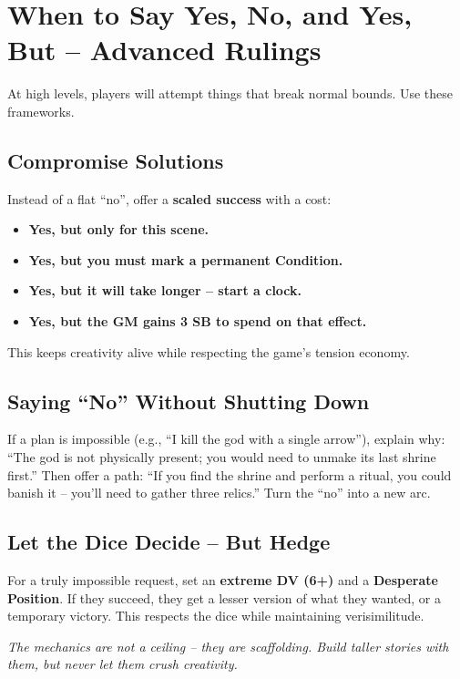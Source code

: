 \section{When to Say Yes, No, and Yes, But – Advanced Rulings}

At high levels, players will attempt things that break normal bounds. Use these frameworks.

\subsection*{Compromise Solutions}
Instead of a flat “no”, offer a \textbf{scaled success} with a cost:
\begin{itemize}
  \item \textbf{Yes, but only for this scene.}
  \item \textbf{Yes, but you must mark a permanent Condition.}
  \item \textbf{Yes, but it will take longer – start a clock.}
  \item \textbf{Yes, but the GM gains 3 SB to spend on that effect.}
\end{itemize}
This keeps creativity alive while respecting the game’s tension economy.

\subsection*{Saying “No” Without Shutting Down}
If a plan is impossible (e.g., “I kill the god with a single arrow”), explain why: “The god is not physically present; you would need to unmake its last shrine first.” Then offer a path: “If you find the shrine and perform a ritual, you could banish it – you’ll need to gather three relics.” Turn the “no” into a new arc.

\subsection*{Let the Dice Decide – But Hedge}
For a truly impossible request, set an \textbf{extreme DV (6+)} and a \textbf{Desperate Position}. If they succeed, they get a lesser version of what they wanted, or a temporary victory. This respects the dice while maintaining verisimilitude.

\begin{tcolorbox}[colback=blue!5!white, colframe=blue!75!black, title=GM Golden Rule for Advanced Play]
\emph{The mechanics are not a ceiling – they are scaffolding. Build taller stories with them, but never let them crush creativity.}
\end{tcolorbox}